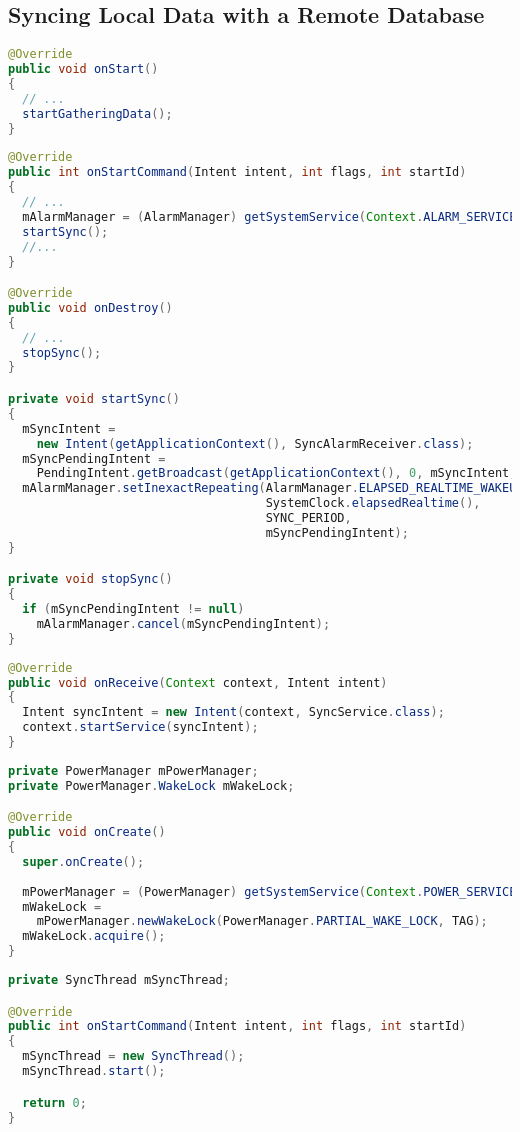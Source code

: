 \documentclass[11pt, a4paper, oneside, english]{scrbook}
\begin{document}
\subsection{Syncing Local Data with a Remote Database} %
\label{sub:syncing_local_data_with_a_remote_database}
\begin{lstlisting}[language=Java, numbers=none]
@Override
public void onStart()
{
  // ...
  startGatheringData();
}
\end{lstlisting}
\begin{lstlisting}[language=Java, numbers=none]
@Override
public int onStartCommand(Intent intent, int flags, int startId)
{
  // ...
  mAlarmManager = (AlarmManager) getSystemService(Context.ALARM_SERVICE);
  startSync();
  //...
}

@Override
public void onDestroy()
{
  // ...
  stopSync();
}

private void startSync()
{
  mSyncIntent = 
    new Intent(getApplicationContext(), SyncAlarmReceiver.class);
  mSyncPendingIntent = 
    PendingIntent.getBroadcast(getApplicationContext(), 0, mSyncIntent, 0);
  mAlarmManager.setInexactRepeating(AlarmManager.ELAPSED_REALTIME_WAKEUP,
                                    SystemClock.elapsedRealtime(),
                                    SYNC_PERIOD,
                                    mSyncPendingIntent);
}

private void stopSync()
{
  if (mSyncPendingIntent != null)
    mAlarmManager.cancel(mSyncPendingIntent);
}
\end{lstlisting}
\begin{lstlisting}[language=Java, numbers=none]
@Override
public void onReceive(Context context, Intent intent)
{
  Intent syncIntent = new Intent(context, SyncService.class);
  context.startService(syncIntent);
}
\end{lstlisting}
\begin{lstlisting}[language=Java, numbers=none]
private PowerManager mPowerManager;
private PowerManager.WakeLock mWakeLock;

@Override
public void onCreate()
{
  super.onCreate();
    
  mPowerManager = (PowerManager) getSystemService(Context.POWER_SERVICE);
  mWakeLock =
    mPowerManager.newWakeLock(PowerManager.PARTIAL_WAKE_LOCK, TAG);
  mWakeLock.acquire();
}
\end{lstlisting}
\begin{lstlisting}[language=Java, numbers=none]
private SyncThread mSyncThread;

@Override
public int onStartCommand(Intent intent, int flags, int startId)
{
  mSyncThread = new SyncThread();
  mSyncThread.start();

  return 0;
}
\end{lstlisting}
\end{document}
